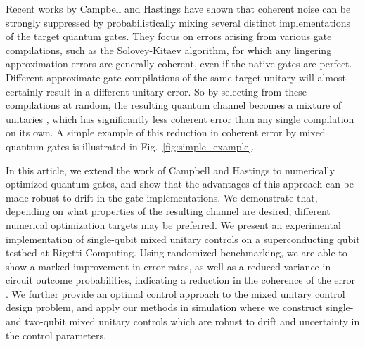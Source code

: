 \documentclass[aps,nofootinbib,pra,notitlepage,twocolumn]{revtex4-1}
\begin{document}
Recent works by Campbell \cite{Campbell2017,1811.08017} and Hastings \cite{Hastings2017} have shown that coherent noise can be strongly suppressed by probabilistically mixing several distinct implementations of the target quantum gates. They focus on errors arising from various gate compilations, such as the Solovey-Kitaev algorithm, for which any lingering approximation errors are generally coherent, even if the native gates are perfect. Different approximate gate compilations of the same target unitary will almost certainly result in a different unitary error. So by selecting from these compilations at random, the resulting quantum channel becomes a mixture of unitaries \cite{DBLP:journals/corr/cs-CC-0012017}, which has significantly less coherent error than any single compilation on its own. A simple example of this reduction in coherent error by mixed quantum gates is illustrated in Fig.~\ref{fig:simple_example}. 

In this article, we extend the work of Campbell and Hastings to numerically optimized quantum gates, and show that the advantages of this approach can be made robust to drift in the gate implementations. We demonstrate that, depending on what properties of the resulting channel are desired, different numerical optimization targets may be preferred. We present an experimental implementation of single-qubit mixed unitary controls on a superconducting qubit testbed at Rigetti Computing. Using randomized benchmarking, we are able to show a marked improvement in error rates, as well as a reduced variance in circuit outcome probabilities, indicating a reduction in the coherence of the error \cite{Ball2016}. We further provide an optimal control approach to the mixed unitary control design problem, and apply our methods in simulation where we construct single- and two-qubit mixed unitary controls which are robust to drift and uncertainty in the control parameters.


% 
% 




\end{document}
